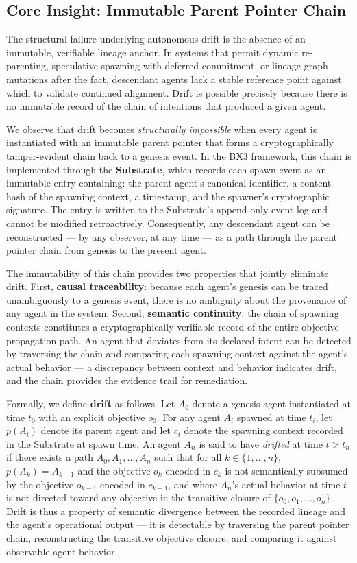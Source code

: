 \subsection{Core Insight: Immutable Parent Pointer Chain}

The structural failure underlying autonomous drift is the absence of an immutable, verifiable lineage anchor. In systems that permit dynamic re-parenting, speculative spawning with deferred commitment, or lineage graph mutations after the fact, descendant agents lack a stable reference point against which to validate continued alignment. Drift is possible precisely because there is no immutable record of the chain of intentions that produced a given agent.

We observe that drift becomes \textit{structurally impossible} when every agent is instantiated with an immutable parent pointer that forms a cryptographically tamper-evident chain back to a genesis event. In the BX3 framework, this chain is implemented through the \textbf{Substrate}, which records each spawn event as an immutable entry containing: the parent agent's canonical identifier, a content hash of the spawning context, a timestamp, and the spawner's cryptographic signature. The entry is written to the Substrate's append-only event log and cannot be modified retroactively. Consequently, any descendant agent can be reconstructed — by any observer, at any time — as a path through the parent pointer chain from genesis to the present agent.

The immutability of this chain provides two properties that jointly eliminate drift. First, \textbf{causal traceability}: because each agent's genesis can be traced unambiguously to a genesis event, there is no ambiguity about the provenance of any agent in the system. Second, \textbf{semantic continuity}: the chain of spawning contexts constitutes a cryptographically verifiable record of the entire objective propagation path. An agent that deviates from its declared intent can be detected by traversing the chain and comparing each spawning context against the agent's actual behavior — a discrepancy between context and behavior indicates drift, and the chain provides the evidence trail for remediation.

Formally, we define \textbf{drift} as follows. Let $A_0$ denote a genesis agent instantiated at time $t_0$ with an explicit objective $o_0$. For any agent $A_i$ spawned at time $t_i$, let $p(A_i)$ denote its parent agent and let $c_i$ denote the spawning context recorded in the Substrate at spawn time. An agent $A_n$ is said to have \textit{drifted} at time $t > t_n$ if there exists a path $A_0, A_1, \ldots, A_n$ such that for all $k \in \{1, \ldots, n\}$, $p(A_k) = A_{k-1}$ and the objective $o_k$ encoded in $c_k$ is not semantically subsumed by the objective $o_{k-1}$ encoded in $c_{k-1}$, and where $A_n$'s actual behavior at time $t$ is not directed toward any objective in the transitive closure of $\{o_0, o_1, \ldots, o_n\}$. Drift is thus a property of semantic divergence between the recorded lineage and the agent's operational output — it is detectable by traversing the parent pointer chain, reconstructing the transitive objective closure, and comparing it against observable agent behavior.

